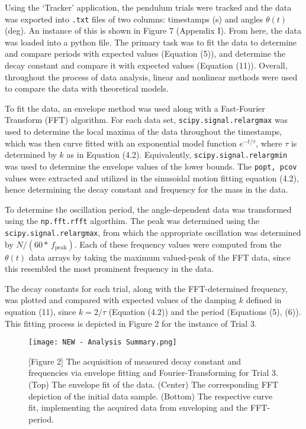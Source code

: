 \documentclass[11pt]{article}
\begin{document}
\begin{multicols}{2}
     \selectfont Using the `Tracker' application, the pendulum trials were tracked and the data was exported into \verb!.txt! files of two columns: timestamps (s) and angles $\theta(t)$ (deg). An instance of this is shown in Figure 7 (Appendix I). From here, the data was loaded into a python file. The primary task was to fit the data to determine and compare periods with expected values (Equation (5)), and determine the decay constant and compare it with expected values (Equation (11)). Overall, throughout the process of data analysis, linear and nonlinear methods were used to compare the data with theoretical models.
    
    To fit the data, an envelope method was used along with a Fast-Fourier Transform (FFT) algorithm. For each data set, \verb!scipy.signal.relargmax! was used to determine the local maxima of the data throughout the timestamps, which was then curve fitted with an exponential model function $e^{-t/\tau}$, where $\tau$ is determined by $k$ as in Equation (4.2). Equivalently, \verb!scipy.signal.relargmin! was used to determine the envelope values of the lower bounds. The \verb!popt, pcov! values were extracted and utilized in the sinusoidal motion fitting equation (4.2), hence determining the decay constant and frequency for the mass in the data. 

    To determine the oscillation period, the angle-dependent data was transformed using the \verb!np.fft.rfft! algorthim. The peak was determined using the \verb!scipy.signal.relargmax!, from which the appropriate oscillation was determined by $N/(60*\,f_{\text{peak}})$. Each of these frequency values were computed from the $\theta(t)$ data arrays by taking the maximum valued-peak of the FFT data, since this resembled the most prominent frequency in the data. 

    The decay constants for each trial, along with the FFT-determined frequency, was plotted and compared with expected values of the damping $k$ defined in equation (11), since $k = 2/\tau$ (Equation (4.2)) and the period (Equations (5), (6)). This fitting process is depicted in Figure 2 for the instance of Trial 3. 

    \begin{figure}[H]
        \flushleft
        \texttt{[image: NEW - Analysis Summary.png]}
        \caption*{[Figure 2] The acquisition of measured decay constant and frequencies via envelope fitting and Fourier-Transforming for Trial 3. (Top) The envelope fit of the data. (Center) The corresponding FFT depiction of the initial data sample. (Bottom) The respective curve fit, implementing the acquired data from enveloping and the FFT-period.}
    \end{figure}
    

\end{multicols}
\end{document}
